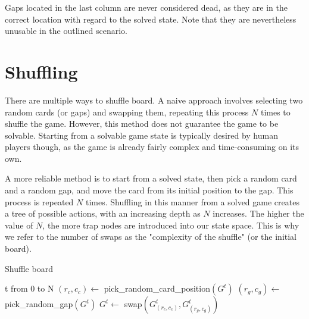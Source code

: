 Gaps located in the last column are never considered dead, as they are in the correct location with regard to the solved state. Note that they are nevertheless unusable in the outlined scenario.


\section{Shuffling}
There are multiple ways to shuffle board. A naive approach involves selecting two random cards (or gaps) and swapping them, repeating this process $N$ times to shuffle the game. However, this method does not guarantee the game to be solvable. Starting from a solvable game state is typically desired by human players though, as the game is already fairly complex and time-consuming on its own.

A more reliable method is to start from a solved state, then pick a random card and a random gap, and move the card from its initial position to the gap. This process is repeated $N$ times. Shuffling in this manner from a solved game creates a tree of possible actions, with an increasing depth as $N$ increases. The higher the value of $N$, the more trap nodes are introduced into our state space. This is why we refer to the number of swaps as the "complexity of the shuffle" (or the initial board).

\begin{algorithm}[H]
    \caption{Shuffle board}
    \begin{algorithmic}
        \For t from 0 to N
            \State $(r_c, c_c) \gets$ pick\_random\_card\_position$\left(G^t\right)$
            \State $(r_g, c_g) \gets$ pick\_random\_gap$\left(G^t\right)$
            \State $G^t \gets$ swap$\left(G^t_{(r_c,c_c)}, G^t_{(r_g,c_g)}\right)$
        \EndFor
    \end{algorithmic}
\end{algorithm}

